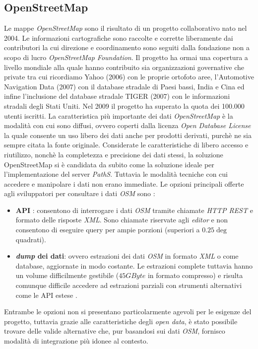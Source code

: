 \subsection{OpenStreetMap}
Le mappe \emph{OpenStreetMap} \cite{openstreetmap} sono il risultato di un progetto collaborativo nato nel 2004. Le informazioni cartografiche sono raccolte e corrette liberamente dai contributori la cui direzione e coordinamento sono seguiti dalla fondazione non a scopo di lucro \emph{OpenStreetMap Foundation}. Il progetto ha ormai una copertura a livello mondiale alla quale hanno contribuito sia organizzazioni governative che private tra cui ricordiamo Yahoo (2006) con le proprie ortofoto aree, l'Automotive Navigation Data (2007) con il database stradale di Paesi bassi, India e Cina ed infine l'inclusione del database stradale TIGER (2007) con le informazioni stradali degli Stati Uniti. Nel 2009 il progetto ha superato la quota dei 100.000 utenti iscritti. La caratteristica più importante dei dati \emph{OpenStreetMap} è la modalità con cui sono diffusi, ovvero coperti dalla licenza \emph{Open Database License} la quale consente un uso libero dei dati anche per prodotti derivati, purchè ne sia sempre citata la fonte originale.
Considerate le caratteristiche di libero accesso e riutilizzo, nonchè la completezza e precisione dei dati stessi, la soluzione OpenStreetMap si è candidata da subito come la soluzione ideale per l'implementazione del server \emph{PathS}. Tuttavia le modalità tecniche con cui accedere e manipolare i dati non erano immediate. Le opzioni principali offerte agli sviluppatori per consultare i dati \emph{OSM} sono \cite{openstreetmap-sdk}:
\begin{itemize}
  \item \textbf{API} \cite{openstreetmap-api}: consentono di interrogare i dati \emph{OSM} tramite chiamate \emph{HTTP REST} e formato delle risposte \emph{XML}. Sono chiamate riservate agli \emph{editor} e non consentono di eseguire query per ampie porzioni (superiori a $0.25\deg$ quadrati).    
  \item \textbf{\emph{dump} dei dati}: ovvero estrazioni dei dati \emph{OSM} in formato \emph{XML} o come database, aggiornate in modo costante. Le estrazioni complete tuttavia hanno un volume difficilmente gestibile ($45GByte$ in formato compresso) e risulta comunque difficile accedere ad estrazioni parziali con strumenti alternativi come le API estese \cite{openstreetmap-xapi}. 
\end{itemize}
Entrambe le opzioni non si presentano particolarmente agevoli per le esigenze del progetto, tuttavia grazie alle caratteristiche degli \emph{open data}, è stato possibile trovare delle valide alternative che, pur basandosi sui dati \emph{OSM}, fornisco modalità di integrazione più idonee al contesto.

